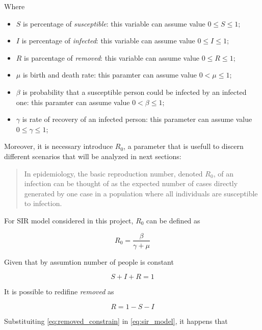 Where
\begin{itemize}
    \item $S$ is percentage of \textit{susceptible}: this variable can assume value $0 \leq S \leq 1$;
    \item $I$ is percentage of \textit{infected}: this variable can assume value $0 \leq I \leq 1$;
    \item $R$ is parcentage of \textit{removed}: this variable can assume value $0 \leq R \leq 1$;
    \item $\mu$ is birth and death rate: this paramter can assume value $0 < \mu \leq 1$;
    \item $\beta$ is probability that a susceptible person could be infected by an infected one: this paramter can assume value $0 < \beta \leq 1$;
    \item $\gamma$ is rate of recovery of an infected person: this parameter can assume value $0 \leq \gamma \leq 1$;
\end{itemize}

Moreover, it is necessary introduce $R_0$, a parameter that is usefull to discern different scenarios that will be analyzed in next sections:
\begin{quote}
    In epidemiology, the basic reproduction number, denoted $R_0$, of an infection can be thought of as the expected number of cases directly generated by one case in a population where all individuals are susceptible to infection. \cite{bib:r0_definition}
\end{quote}

For SIR model considered in this project, $R_0$ can be defined as

\begin{equation}
    \label{eq:r0_definition}
    R_0 = \frac{\beta}{\gamma + \mu}
\end{equation}

Given that by assumtion number of people is constant

\begin{equation}
\label{eq:population_constraint}
    S + I + R = 1
\end{equation}

It is possible to redifine \textit{removed} as

\begin{equation}
\label{eq:removed_constrain}
    R = 1 - S - I
\end{equation}

Substituiting \ref{eq:removed_constrain} in \ref{eq:sir_model}, it happens that

